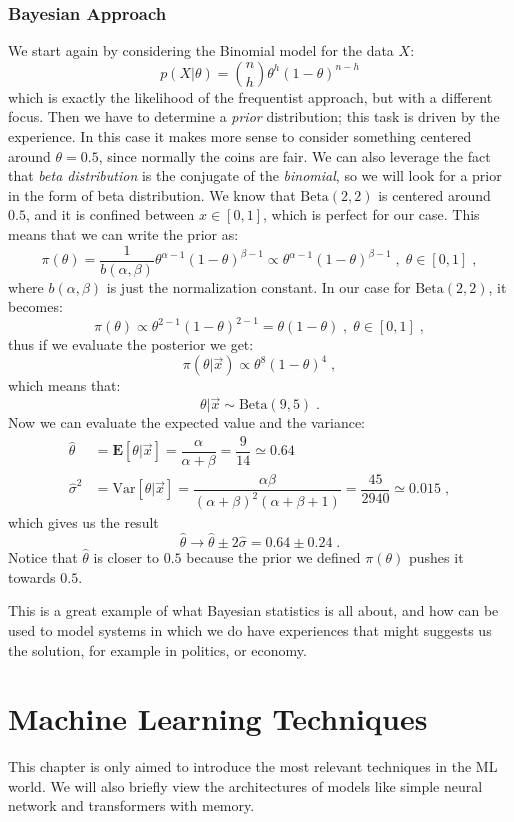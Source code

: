 \documentclass[12pt,a4paper]{article}
\begin{document}
\subsubsection*{Bayesian Approach}
We start again by considering the Binomial model for the data $X$:
$$
 p(X | \theta) = \binom{n}{h} \theta^h (1-\theta)^{n-h}
$$
which is exactly the likelihood of the frequentist approach, but with a different focus.
Then we have to determine a \textit{prior} distribution; this task is driven by the experience. In this case it makes more sense to consider something centered around $\theta = 0.5$, since normally the coins are fair.
We can also leverage the fact that \textit{beta distribution} is the conjugate of the \textit{binomial}, so we will look for a prior in the form of beta distribution.
We know that $\text{Beta}(2,2)$ is centered around $0.5$, and it is confined between $x\in [0,1]$, which is perfect for our case.
This means that we can write the prior as:
$$
\pi(\theta) = \dfrac{1}{b(\alpha,\beta)} \theta^{\alpha-1} (1-\theta)^{\beta - 1}\propto \theta^{\alpha-1} (1-\theta)^{\beta - 1} \;,\; \theta\in[0,1]\;,
$$
where $b(\alpha,\beta)$ is just the normalization constant. In our case for $\text{Beta}(2,2)$, it becomes:
$$
\pi(\theta) \propto \theta^{2-1} (1-\theta)^{2 - 1} = \theta (1-\theta) \;,\; \theta\in[0,1]\;,
$$
thus if we evaluate the posterior we get:
\begin{equation*}
	\pi(\theta | \vec{x}) \propto \theta^{8} (1-\theta)^{4}\;,
\end{equation*}
which means that:
$$
 \theta | \vec{x} \sim \text{Beta}(9,5)\;.
$$
Now we can evaluate the expected value and the variance:
\begin{align*}
	\hat{\theta} &= \mathbf{E}[\theta | \vec{x}] = \dfrac{\alpha}{\alpha + \beta} = \dfrac{9}{14} \simeq 0.64\\[8pt]
	\hat{\sigma}^2 &= \text{Var}[\theta | \vec{x}] = \dfrac{\alpha \beta}{(\alpha+\beta)^2(\alpha+\beta+1)} = \dfrac{45}{2940} \simeq 0.015\;,
\end{align*}
which gives us the result
$$
\hat{\theta} \rightarrow \hat{\theta} \pm 2 \hat{\sigma} = 0.64 \pm 0.24\;.
$$ 
Notice that $\hat{\theta}$ is closer to $0.5$ because the prior we defined $\pi(\theta)$ pushes it towards $0.5$.

This is a great example of what Bayesian statistics is all about, and how can be used to model systems in which we do have experiences that might suggests us the solution, for example in politics, or economy.

\section{Machine Learning Techniques}
This chapter is only aimed to introduce the most relevant techniques in the ML world. We will also briefly view the architectures of models like simple neural network and transformers with memory.
\end{document}
